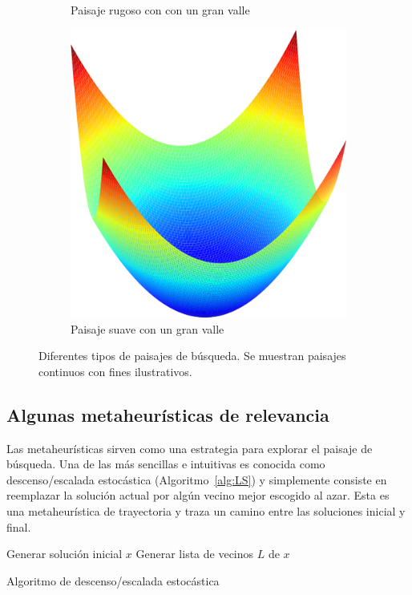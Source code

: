 \begin{figure}[]
\begin{subfigure}{.5\textwidth}
    \caption{Paisaje rugoso con con un gran valle}
\end{subfigure}
\begin{subfigure}{\textwidth}
    \centering
    \includegraphics[scale=.4]{Imagenes/smoothvalley.png}
    \caption{Paisaje suave con un gran valle}
\end{subfigure}
\caption{Diferentes tipos de paisajes de búsqueda. Se muestran paisajes continuos con fines ilustrativos.}
    \label{fig:landtypes}
\end{figure}

\subsection*{Algunas metaheurísticas de relevancia}
Las metaheurísticas sirven como una estrategia para explorar el paisaje de búsqueda. 
%
Una de las más sencillas e intuitivas es conocida como descenso/escalada estocástica (Algoritmo~\ref{alg:LS}) y simplemente consiste en reemplazar la solución actual por algún vecino mejor 
escogido al azar.
%
Esta es una metaheurística de trayectoria y traza un camino entre las soluciones inicial y final.

%
\begin{algorithm}[H]
 Generar solución inicial $x$\;
 Generar lista de vecinos $L$ de $x$\;
    \label{alg:LS}
    \caption{Algoritmo de descenso/escalada estocástica}
\end{algorithm}

